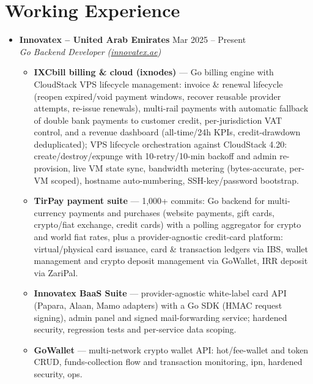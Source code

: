 \documentclass[12pt,a4paper]{article}
\begin{document}
\section{Working Experience}
    \begin{itemize}[label=\tiny$\bullet$, leftmargin=1em, itemsep=6pt]
        \item \textbf{Innovatex -- United Arab Emirates} \hfill {\color{textgrey} Mar 2025 -- Present} \\
        \textit{Go Backend Developer (\href{https://innovatex.ae}{innovatex.ae})}
        \begin{itemize}[label=--, topsep=1pt]
            \item \textbf{IXCbill billing \& cloud (ixnodes)} --- Go billing engine
                with CloudStack VPS lifecycle management: invoice \& renewal lifecycle (reopen
                expired/void payment windows, recover reusable provider attempts,
                re-issue renewals), multi-rail payments with automatic fallback of double
                bank payments to customer credit, per-jurisdiction VAT control, and a
                revenue dashboard (all-time/24h KPIs, credit-drawdown deduplicated); VPS lifecycle orchestration
                against CloudStack 4.20: create/destroy/expunge with 10-retry/10-min
                backoff and admin re-provision, live VM state sync, bandwidth metering
                (bytes-accurate, per-VM scoped), hostname auto-numbering, SSH-key/password
                bootstrap.
            \item \textbf{TirPay payment suite} --- 1,000+ commits: Go backend for
                multi-currency payments and purchases (website payments, gift cards,
                crypto/fiat exchange, credit cards) with a polling aggregator for crypto and world fiat
                rates, plus a provider-agnostic credit-card platform: virtual/physical card
                issuance, card \& transaction ledgers via IBS, wallet management and crypto deposit management
                via GoWallet, IRR deposit via ZariPal.
            \item \textbf{Innovatex BaaS Suite} --- provider-agnostic
                white-label card API (Papara, Alaan, Mamo adapters) with a Go SDK
                (HMAC request signing), admin panel and signed
                mail-forwarding service; hardened security,
                regression tests and per-service data scoping.
            \item \textbf{GoWallet} --- multi-network crypto wallet API: hot/fee-wallet and token CRUD,
                funds-collection flow and transaction monitoring, ipn, hardened security, ops.
        \end{itemize}


\end{itemize}
\end{document}
